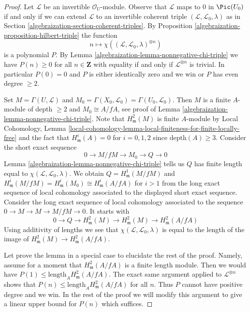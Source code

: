 \begin{proof}

Let $\mathcal{L}$ be an invertible $\mathcal{O}_U$-module.
Observe that $\mathcal{L}$ maps to $0$ in $\Pic(U_0)$
if and only if we can extend $\mathcal{L}$ to an invertible
coherent triple $(\mathcal{L}, \mathcal{L}_0, \lambda)$
as in Section \ref{algebraization-section-coherent-triples}.
By Proposition \ref{algebraization-proposition-hilbert-triple}
the function
$$
n \longmapsto \chi((\mathcal{L}, \mathcal{L}_0, \lambda)^{\otimes n})
$$
is a polynomial $P$. By Lemma \ref{algebraization-lemma-nonnegative-chi-triple}
we have
$P(n) \geq 0$ for all $n \in \mathbf{Z}$ with equality if and only if
$\mathcal{L}^{\otimes n}$ is trivial. In particular $P(0) = 0$
and $P$ is either identically zero and we win or $P$ has even degree $\geq 2$.

\medskip\noindent
Set $M = \Gamma(U, \mathcal{L})$ and
$M_0 = \Gamma(X_0, \mathcal{L}_0) = \Gamma(U_0, \mathcal{L}_0)$.
Then $M$ is a finite $A$-module of depth $\geq 2$
and $M_0 \cong A/fA$, see proof of Lemma \ref{algebraization-lemma-nonnegative-chi-triple}.
Note that $H^2_\mathfrak m(M)$ is finite $A$-module by
Local Cohomology, Lemma
\ref{local-cohomology-lemma-local-finiteness-for-finite-locally-free}
and the fact that $H^i_\mathfrak m(A) = 0$ for $i = 0, 1, 2$
since $\text{depth}(A) \geq 3$.
Consider the short exact sequence
$$
0 \to M/fM \to M_0 \to Q \to 0
$$
Lemma \ref{algebraization-lemma-nonnegative-chi-triple} tells us $Q$ has finite length
equal to $\chi(\mathcal{L}, \mathcal{L}_0, \lambda)$.
We obtain $Q = H^1_\mathfrak m(M/fM)$ and
$H^i_\mathfrak m(M/fM) = H^i_\mathfrak m(M_0) \cong H^i_\mathfrak m(A/fA)$
for $i > 1$ from the long exact sequence of local cohomology
associated to the displayed short exact sequence. Consider the long
exact sequence of local cohomology associated to the sequence
$0 \to M \to M \to M/fM \to 0$. It starts with
$$
0 \to Q \to H^2_\mathfrak m(M) \to H^2_\mathfrak m(M) \to
H^2_\mathfrak m(A/fA)
$$
Using additivity of lengths we see that
$\chi(\mathcal{L}, \mathcal{L}_0, \lambda)$
is equal to the length of the image of
$H^2_\mathfrak m(M) \to H^2_\mathfrak m(A/fA)$.

\medskip\noindent
Let prove the lemma in a special case to elucidate the rest of the proof.
Namely, assume for a moment that $H^2_\mathfrak m(A/fA)$ is
a finite length module. Then
we would have $P(1) \leq \text{length}_A H^2_\mathfrak m(A/fA)$.
The exact same argument applied to $\mathcal{L}^{\otimes n}$ shows that
$P(n) \leq \text{length}_A H^2_\mathfrak m(A/fA)$ for all $n$.
Thus $P$ cannot have positive degree and we win.
In the rest of the proof we will modify this argument to give
a linear upper bound for $P(n)$ which suffices.


\end{proof}
